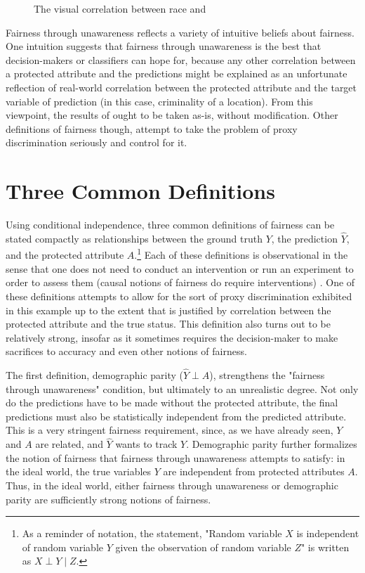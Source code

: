 \begin{figure}[bth]
    \caption{The visual correlation between race and \pp}
    \label{fig:heatmaps_correlation}
\end{figure}
Fairness through unawareness reflects a variety of intuitive beliefs about fairness. One intuition suggests that fairness through unawareness is the best that decision-makers or classifiers can hope for, because any other correlation between a protected attribute and the predictions might be explained as an unfortunate reflection of real-world correlation between the protected attribute and the target variable of prediction (in this case, criminality of a location). From this viewpoint, the results of \pp ought to be taken as-is, without modification. Other definitions of fairness though, attempt to take the problem of proxy discrimination seriously and control for it.

\section{Three Common Definitions}

Using conditional independence, three common definitions of fairness can be stated compactly as relationships between the ground truth $Y$, the prediction $\hat{Y}$, and the protected attribute $A$.\footnote{As a reminder of notation, the statement, "Random variable $X$ is independent of random variable $Y$ given the observation of random variable $Z$" is written as $X \perp Y \mid Z$.} Each of these definitions is observational in the sense that one does not need to conduct an intervention or run an experiment to order to assess them (causal notions of fairness do require interventions) \citep{hardt_equality_2016}. One of these definitions attempts to allow for the sort of proxy discrimination exhibited in this example up to the extent that is justified by correlation between the protected attribute and the true status. This definition also turns out to be relatively strong, insofar as it sometimes requires the decision-maker to make sacrifices to accuracy and even other notions of fairness.

The first definition, demographic parity ($\hat{Y} \perp A$), strengthens the "fairness through unawareness" condition, but ultimately to an unrealistic degree. Not only do the predictions have to be made without the protected attribute, the final predictions must also be statistically independent from the predicted attribute. This is a very stringent fairness requirement, since, as we have already seen, $Y$ and $A$ are related, and $\hat{Y}$ wants to track $Y$. Demographic parity further formalizes the notion of fairness that fairness through unawareness attempts to satisfy: in the ideal world, the true variables $Y$ are independent from protected attributes $A$. Thus, in the ideal world, either fairness through unawareness or demographic parity are sufficiently strong notions of fairness.

